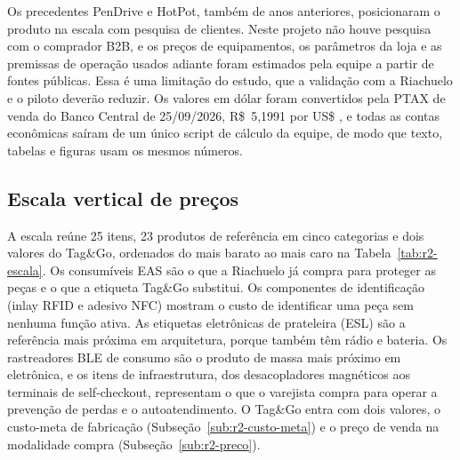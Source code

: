 Os precedentes PenDrive e HotPot, também de anos anteriores, posicionaram o produto na escala com pesquisa de clientes. Neste projeto não houve pesquisa com o comprador B2B, e os preços de equipamentos, os parâmetros da loja e as premissas de operação usados adiante foram estimados pela equipe a partir de fontes públicas. Essa é uma limitação do estudo, que a validação com a Riachuelo e o piloto deverão reduzir. Os valores em dólar foram convertidos pela PTAX de venda do Banco Central de 25/09/2026, R\$~5,1991 por US\$ \cite{bcb2026ptax}, e todas as contas econômicas saíram de um único script de cálculo da equipe, de modo que texto, tabelas e figuras usam os mesmos números.

\subsection{Escala vertical de preços}
\label{sub:r2-escala}

A escala reúne 25 itens, 23 produtos de referência em cinco categorias e dois valores do Tag\&Go, ordenados do mais barato ao mais caro na Tabela~\ref{tab:r2-escala}. Os consumíveis EAS são o que a Riachuelo já compra para proteger as peças e o que a etiqueta Tag\&Go substitui. Os componentes de identificação (inlay RFID e adesivo NFC) mostram o custo de identificar uma peça sem nenhuma função ativa. As etiquetas eletrônicas de prateleira (ESL) são a referência mais próxima em arquitetura, porque também têm rádio e bateria. Os rastreadores BLE de consumo são o produto de massa mais próximo em eletrônica, e os itens de infraestrutura, dos desacopladores magnéticos aos terminais de self-checkout, representam o que o varejista compra para operar a prevenção de perdas e o autoatendimento. O Tag\&Go entra com dois valores, o custo-meta de fabricação (Subseção~\ref{sub:r2-custo-meta}) e o preço de venda na modalidade compra (Subseção~\ref{sub:r2-preco}).

